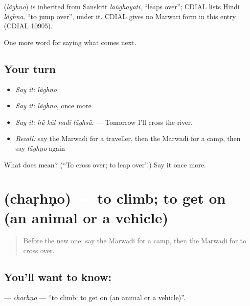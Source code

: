 \begin{cousinweb}
\textbf{} (\emph{lā̃ghṇo}) is inherited from Sanskrit \emph{laṅghayati}, \textquotedblleft{}leaps over\textquotedblright{}; CDIAL lists Hindi \emph{lā̃ghnā}, \textquotedblleft{}to jump over\textquotedblright{}, under it. CDIAL gives no Marwari form in this entry (CDIAL 10905).
\end{cousinweb}

\begin{grammarlens}[title={What you've built}]
One more word for saying what comes next.
\end{grammarlens}

\subsection*{Your turn}
\begin{itemize}
\raggedright
  \item \emph{Say it:} \emph{lā̃ghṇo}
  \item \emph{Say it:} \emph{lā̃ghṇo}, once more
  \item \emph{Say it:} \emph{hū̃ kāl nadī lā̃ghsū̃.} — Tomorrow I'll cross the river.
  \item \emph{Recall:} say the Marwadi for a traveller, then the Marwadi for a camp, then say \emph{lā̃ghṇo} again
\end{itemize}

\begin{tcolorbox}[breakable,colback=teal!4,colframe=teal!35!black,title={Before you move on}]
What does  mean? (\textquotedblleft{}To cross over; to leap over\textquotedblright{}.) Say it once more.
\end{tcolorbox}
\section[\texorpdfstring{\mw{चढ़णो} (chaṛhṇo)}{चढ़णो (chaṛhṇo)}]{ (chaṛhṇo) — to climb; to get on (an animal or a vehicle)}

\label{lesson:MW-C217-charhno}



\begin{quote}
Before the new one: say the Marwadi for a camp, then the Marwadi for to cross over.
\end{quote}

\subsection*{You'll want to know: }
\textbf{} — \emph{chaṛhṇo} — \textquotedblleft{}to climb; to get on (an animal or a vehicle)\textquotedblright{}.


